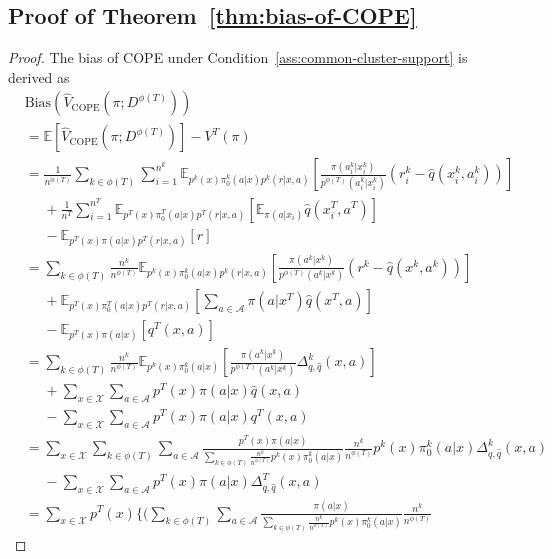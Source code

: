 \subsection{Proof of Theorem~\ref{thm:bias-of-COPE}}
\label{app:b1}
\begin{proof}
The bias of COPE under Condition~\ref{ass:common-cluster-support} is derived as
\begin{align*}
    &\mathrm{Bias}(\hat V_{\mathrm{COPE}}(\pi;D^{\phi(T)}))
    \\&=\mathbb{E}[\hat V_{\mathrm{COPE}}(\pi;D^{\phi(T)})]-V^T(\pi)
    \\&=\frac{1}{n^{\phi(T)}}\sum_{k\in\phi(T)}\sum_{i=1}^{n^{k}}
    \mathbb{E}_{p^{k}(x)\pi_0^{k}(a|x)p^{k}(r|x,a)}[\frac{\pi(a_{i}^{k}|x_{i}^{k})}{{p^{\phi(T)}(a_{i}^{k}|x_{i}^{k})}}(r_{i}^{k}-\hat{q}(x_{i}^{k},a_{i}^{k}))]
    \\&\phantom{=}+\frac{1}{n^{T}}\sum_{i=1}^{n^{T}}\mathbb{E}_{p^{T}(x)\pi_0^{T}(a|x)p^{T}(r|x,a)}
    [\mathbb{E}_{\pi(a|x_{i})}\hat{q}(x_{i}^{T},a^T)]
    \\&\phantom{=}-\mathbb {E}_{p^T(x)\pi(a|x)p^T(r|x,a)}[r]
    \\&=\sum_{k\in\phi(T)}\frac{n^{k}}{n^{\phi(T)}}\mathbb{E}_{p^{k}(x)\pi_0^{k}(a|x)p^{k}(r|x,a)}[\frac{\pi(a^{k}|x^{k})}{{p^{\phi(T)}(a^{k}|x^{k})}}(r^{k}-\hat{q}(x^{k},a^{k}))]
    \\&\phantom{=}+\mathbb{E}_{p^{T}(x)\pi_0^{T}(a|x)p^{T}(r|x,a)}
    [\sum_{a \in \mathcal A}\pi(a|x^T)\hat{q}(x^T,a)]
    \\&\phantom{=}-\mathbb {E}_{p^T(x)\pi(a|x)}[q^T(x,a)]
    \\&=\sum_{k\in\phi(T)}\frac{n^{k}}{n^{\phi(T)}}\mathbb{E}_{p^{k}(x)\pi_0^{k}(a|x)}[\frac{\pi(a^{k}|x^{k})}{{p^{\phi(T)}(a^{k}|x^{k})}}\Delta_{q,\hat{q}}^k(x,a)]
    \\&\phantom{=}+\sum_{x\in\mathcal{X}}
    \sum_{a \in \mathcal A}p^{T}(x)\pi(a|x)\hat{q}(x,a)
    \\&\phantom{=}-\sum_{x\in\mathcal{X}}
    \sum_{a \in \mathcal A}p^{T}(x)\pi(a|x)q^T(x,a)
    \\&=
    \sum_{x\in\mathcal{X}}\sum_{k\in\phi(T)}\sum_{a\in\mathcal{A}}\frac{p^T(x)\pi(a|x)}{\sum_{k \in \phi(T)}\frac{n^{k}}{n^{\phi(T)}} p^{k}(x)\pi_0^{k}(a|x)}\frac{n^k}{n^{\phi(T)}}
    p^{k}(x)\pi_0^{k}(a|x)\Delta_{q,\hat{q}}^k(x,a)
    \\&\phantom{=}-\sum_{x\in\mathcal{X}}
    \sum_{a \in \mathcal A}p^{T}(x)\pi(a|x)\Delta_{q,\hat{q}}^T(x,a)
    \\&=
    \sum_{x\in\mathcal{X}}p^T(x)\{(\sum_{k\in\phi(T)}\sum_{a\in\mathcal{A}}\frac{\pi(a|x)}{\sum_{k \in \phi(T)}\frac{n^{k}}{n^{\phi(T)}} p^{k}(x)\pi_0^{k}(a|x)}\frac{n^k}{n^{\phi(T)}}

\end{align*}
\end{proof}
